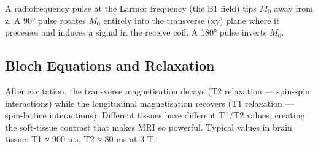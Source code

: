 				


				

A radiofrequency pulse at the Larmor frequency (the B1 field) tips $M_0$ away from z. A 90° pulse rotates $M_0$ entirely into the transverse (xy) plane where it precesses and induces a signal in the receive coil. A 180° pulse inverts $M_0$.

				

\subsection{Bloch Equations and Relaxation}

				

After excitation, the transverse magnetisation decays (T2 relaxation — spin-spin interactions) while the longitudinal magnetisation recovers (T1 relaxation — spin-lattice interactions). Different tissues have different T1/T2 values, creating the soft-tissue contrast that makes MRI so powerful. Typical values in brain tissue: T1 ≈ 900 ms, T2 ≈ 80 ms at 3 T.



